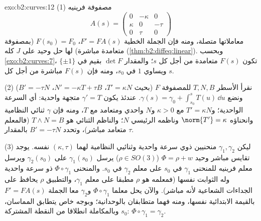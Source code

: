 \begin{solution}{exo:b2:curves:12}
(1) مصفوفة فرينيه
\[
A(s) = \begin{pmatrix} 0 & -\kappa & 0\\ \kappa & 0 & -\tau\\
0 & \tau & 0\end{pmatrix}
\]
معاملاتها متصلة، ومنه فإن الجملة الخطية $F' = FA(s)$، $F(s_0) = F_0$ (بمصفوفة
متعامدة مباشرة) لها حل وحيد على $J$ كله (\cref{thm:b2:diffeq:linear}). وبحسب \cref{exo:b2:curves:7}،
تكون $F(s)$ متعامدة من أجل كل $s$؛ والمقدار $\det F$  بقيم
في $\{\pm1\}$ ويساوي $1$ في $s_0$، ومنه فإن $F(s)$ مباشرة من أجل
كل $s$.

(2) نقرأ الأسطر $T, N, B$ للمصفوفة $F$ (بحيث $T' = \kappa
N$، $N' = -\kappa T + \tau B$،
$B' = -\tau N$) ونضع $\gamma(s) = \gamma_0 + \int_{s_0}^s T(u)\,\dd u$. عندئذ يكون $\gamma' = T$ متجهة واحدية: أي السرعة
الواحدية؛ و$T' = \kappa N$ مع $\kappa > 0$ و$N$ واحدي ومتعامد مع $T$، ومنه
فإن $\gamma$ ثنائي النظامية وانحناؤه $\norm{T'} = \kappa$ وناظمه الرئيسي $N$؛
والناظم الثنائي هو $T \wedge N = B$ (فالمعلم متعامد مباشر)، وتحدد $B' = -\tau N$
 بالمقدار $\tau$.

(3) ليكن $\gamma_1, \gamma_2$ منحنيين ذوي سرعة واحدية وثنائيي النظامية لهما
$(\kappa, \tau)$ نفسه. يوجد تقايس مباشر وحيد $\Phi = \rho + w$ ($\rho \in SO(3)$) يرسل $\gamma_1(s_0)$ على
$\gamma_2(s_0)$ ويرسل معلم فرينيه للمنحنى $\gamma_1$ في $s_0$ على معلم $\gamma_2$
في $s_0$. والمنحنى $\Phi\circ\gamma_1$ ذو سرعة واحدية وله الثوابت نفسها
(فمعلمه هو $\rho$ مطبقا على معلم $\gamma_1$، والتطبيق $\rho$ يحافظ على
الجداءات الشعاعية لأنه مباشر). والآن يحل معلما $\Phi\circ\gamma_1$ و$\gamma_2$ معا
الجملة $F' =
FA(s)$ بالقيمة الابتدائية نفسها، ومنه فهما متطابقان
بالوحدانية؛ وبوجه خاص يتطابق المماسان، وبالمكاملة انطلاقا من النقطة
المشتركة $s_0$: $\Phi\circ\gamma_1 = \gamma_2$.
\end{solution}

